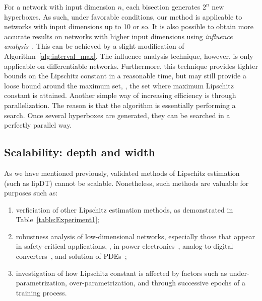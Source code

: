 \documentclass[11pt,times]{article}
\begin{document}
For a network with input dimension $n$, each bisection generates $2^n$
new hyperboxes. As such, under favorable conditions, our method is
applicable to networks with input dimensions up to 10 or so. It is
also possible to obtain more accurate results on networks with higher
input dimensions using \emph{influence
  analysis}~\parencite{Wang_et_al:symbolic_intervals:2018}. This can
be achieved by a slight modification of
Algorithm~\ref{alg:interval_max}. The influence analysis technique,
however, is only applicable on differentiable networks. Furthermore,
this technique provides tighter bounds on the Lipschitz constant in a
reasonable time, but may still provide a loose bound around the
maximum set, {\ie}, the set where maximum Lipschitz constant is
attained. Another simple way of increasing efficiency is through
parallelization. The reason is that the algorithm is essentially
performing a search. Once several hyperboxes are generated, they can
be searched in a perfectly parallel way.












\subsection{Scalability: depth and width}
\label{subsec:scalability:depth_width}

As we have mentioned previously, validated methods of Lipschitz
estimation (such as lipDT) cannot be scalable. Nonetheless, such
methods are valuable for purposes such as:

\begin{enumerate}[label=(\roman*)]
\item verficiation of other Lipschitz estimation methods, as
  demonstrated in Table~\ref{table:Experiment1};

\item robustness analysis of low-dimensional networks, especially
  those that appear in safety-critical applications, {\eg}, in power
  electronics~\parencite{Dragicevic_et_al:AI_Aided_PowElec:2019},
  analog-to-digital converters~\parencite{Tankimanova:NN_ADC:2018}, and
  solution of \acp{PDE}~\parencite{Rudd:PDE_NN:PhD_Thesis:2013};

\item \label{item:lipDT_under_over_param} investigation of how
  Lipschitz constant is affected by factors such as
  under-parametrization, over-parametrization, and through successive
  epochs of a training process.
  
\end{enumerate}
\end{document}
